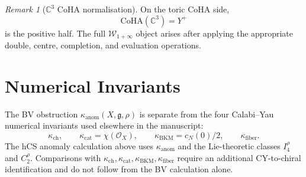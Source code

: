 \documentclass[11pt]{amsart}
\providecommand{\C}{\mathbb{C}}
\providecommand{\gfrak}{\mathfrak{g}}
\providecommand{\cO}{\mathcal{O}}
\providecommand{\kanom}{\kappa_{\mathrm{anom}}}
\providecommand{\kch}{\kappa_{\mathrm{ch}}}
\providecommand{\kcat}{\kappa_{\mathrm{cat}}}
\providecommand{\kBKM}{\kappa_{\mathrm{BKM}}}
\providecommand{\kfib}{\kappa_{\mathrm{fiber}}}
\theoremstyle{plain}
\theoremstyle{definition}
\theoremstyle{remark}
\newtheorem{remark}[theorem]{Remark}
\begin{document}
\begin{remark}[$\C^3$ CoHA normalisation]
\label{rem:c3-coha}
On the toric CoHA side,
\[
  \mathrm{CoHA}(\C^3)=Y^+
\]
is the positive half. The full $\mathcal W_{1+\infty}$ object arises
after applying the appropriate double, centre, completion, and
evaluation operations.
\end{remark}

\section{Numerical Invariants}
\label{sec:numerical-invariants}

The BV obstruction $\kanom(X,\gfrak,\rho)$ is separate from the four
Calabi--Yau numerical invariants used elsewhere in the manuscript:
\[
  \kch,\qquad
  \kcat=\chi(\cO_X),\qquad
  \kBKM=c_N(0)/2,\qquad
  \kfib.
\]
The hCS anomaly calculation above uses $\kanom$ and the Lie-theoretic
classes $I_4^\rho$ and $C_2^\rho$. Comparisons with
$\kch,\kcat,\kBKM,\kfib$ require an additional CY-to-chiral
identification and do not follow from the BV calculation alone.
\end{document}

